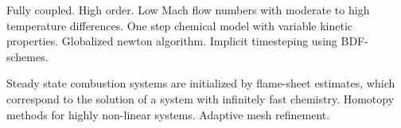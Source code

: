 \glsresetall
Fully coupled.
High order.
Low Mach flow numbers with moderate to high temperature differences. 
One step chemical model with variable kinetic properties.
Globalized newton algorithm.
Implicit timesteping using BDF-schemes. 


Steady state combustion systems are initialized by flame-sheet estimates, which correspond to the solution of a system with infinitely fast chemistry. 
Homotopy methods for highly non-linear systems.
Adaptive mesh refinement.


